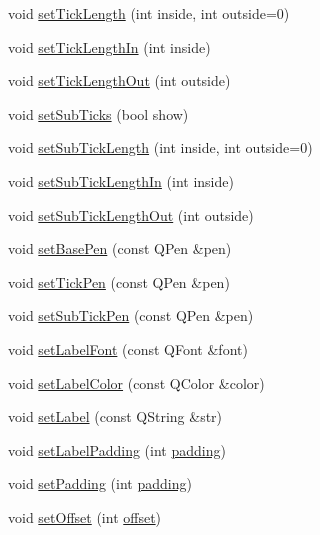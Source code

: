 \begin{DoxyCompactItemize}
void \hyperlink{class_q_c_p_axis_a62ec40bebe3540e9c1479a8fd2be3b0d}{set\+Tick\+Length} (int inside, int outside=0)
\item 
void \hyperlink{class_q_c_p_axis_afae1a37a99611366275a51204d991739}{set\+Tick\+Length\+In} (int inside)
\item 
void \hyperlink{class_q_c_p_axis_a3b8a0debd1ffedd2c22d0592dfbb4e62}{set\+Tick\+Length\+Out} (int outside)
\item 
void \hyperlink{class_q_c_p_axis_afa0ce8d4d0015ed23dcde01f8bc30106}{set\+Sub\+Ticks} (bool show)
\item 
void \hyperlink{class_q_c_p_axis_ab702d6fd42fc620607435339a1c2a2e1}{set\+Sub\+Tick\+Length} (int inside, int outside=0)
\item 
void \hyperlink{class_q_c_p_axis_ac46fa2a993a9f5789540977610acf1de}{set\+Sub\+Tick\+Length\+In} (int inside)
\item 
void \hyperlink{class_q_c_p_axis_a4c6dfc3963492ed72a77724012df5f23}{set\+Sub\+Tick\+Length\+Out} (int outside)
\item 
void \hyperlink{class_q_c_p_axis_a778d45fb71b3c7ab3bb7079e18b058e4}{set\+Base\+Pen} (const Q\+Pen \&pen)
\item 
void \hyperlink{class_q_c_p_axis_ad80923bcc1c5da4c4db602c5325e797e}{set\+Tick\+Pen} (const Q\+Pen \&pen)
\item 
void \hyperlink{class_q_c_p_axis_aede4028ae7516bd51a60618a8233f9cf}{set\+Sub\+Tick\+Pen} (const Q\+Pen \&pen)
\item 
void \hyperlink{class_q_c_p_axis_a71ac1a47f7547e490a8c4311d1433cf3}{set\+Label\+Font} (const Q\+Font \&font)
\item 
void \hyperlink{class_q_c_p_axis_a6c906fe56d75f0122335b9f79b999608}{set\+Label\+Color} (const Q\+Color \&color)
\item 
void \hyperlink{class_q_c_p_axis_a33bcc382c111c9f31bb0687352a2dea4}{set\+Label} (const Q\+String \&str)
\item 
void \hyperlink{class_q_c_p_axis_a4391192a766e5d20cfe5cbc17607a7a2}{set\+Label\+Padding} (int \hyperlink{class_q_c_p_axis_a07df379d5c017b8f3a4702532eb037b2}{padding})
\item 
void \hyperlink{class_q_c_p_axis_a5691441cb3de9e9844855d339c0db279}{set\+Padding} (int \hyperlink{class_q_c_p_axis_a07df379d5c017b8f3a4702532eb037b2}{padding})
\item 
void \hyperlink{class_q_c_p_axis_a04a652603cbe50eba9969ee6d68873c3}{set\+Offset} (int \hyperlink{class_q_c_p_axis_aef66fa16353b4993b1cceabfb644a1a9}{offset})
\item 

\end{DoxyCompactItemize}
